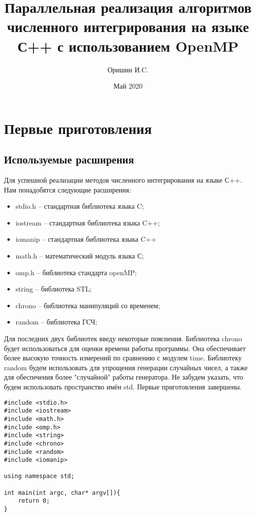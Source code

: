 \documentclass{article}
\title{Параллельная реализация алгоритмов численного интегрирования на языке С++ с использованием OpenMP}
\author{Оришин И.C.}
\date{Май 2020}
\begin{document}
\maketitle
\newpage
\section{Первые приготовления}
\subsection{Используемые расширения}
Для успешной реализации методов численного интегрирования на языке С++. Нам понадобятся следующие расширения:
\begin{itemize}
  \item stdio.h – стандартная библиотека языка C;
  \item iostream – стандартная библиотека языка C++;
  \item iomanip – стандартная библиотека языка C++
  \item math.h – математический модуль языка С;
  \item omp.h – библиотека стандарта openMP;
  \item string – библиотека STL;
  \item chrono – библиотека манипуляций со временем;
  \item random – библиотека ГСЧ;
\end{itemize}

Для последних двух библиотек введу некоторые пояснения. Библиотека chrono
будет использоваться для оценки времени работы программы. Она обеспечивает более
высокую точность измерений по сравнению с модулем time. Библиотеку random будем
использовать для упрощения генерации случайных чисел, а также для обеспечения более "случайной" работы генератора. 
Не забудем указать, что будем использовать пространство имён std. Первые приготовления завершены.
\begin{lstlisting}
#include <stdio.h>
#include <iostream>
#include <math.h>
#include <omp.h>
#include <string>
#include <chrono>
#include <random>
#include <iomanip> 

using namespace std;

int main(int argc, char* argv[]){
    return 0;
}
\end{lstlisting}
\end{document}
